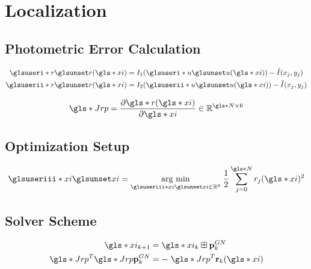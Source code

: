 \section{Localization}

\subsection{Photometric Error Calculation}
    
\begin{align*}
  \gi{r}(\g{xi}) &= I_1(\gi{u}(\g{xi})) - \hat{I}(x_j, y_j) \\
  \gii{r}(\g{xi}) &= I_2(\gii{u}(\g{xi})) - \hat{I}(x_j, y_j)
\end{align*}
    
\begin{equation*}
  \g{Jrp} = \frac{\partial \g{r}(\g{xi})}{\partial\g{xi}}
  \in\mathbb{R}^{\g{N}\times 6}
\end{equation*}

\subsection{Optimization Setup}

\begin{equation*}
  \giii{xi} =  \argmin{\giii{xi}\in\mathbb{R}^6} \frac{1}{2} 
  \sum_{j = 0}^{\g{N}} r_j(\g{xi})^2
\end{equation*}

\subsection{Solver Scheme}
    
\begin{align*}
  \g{xi}_{k+1} &= \g{xi}_k \boxplus \mathbf p_k^{GN}\\
  \g{Jrp}^T \g{Jrp} \mathbf p_k^{GN} &= - \g{Jrp} ^T \mathbf r_k(\g{xi})
\end{align*}
